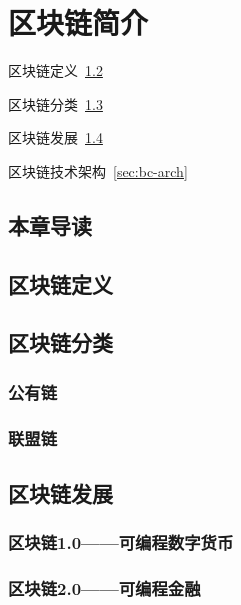 \chapter{区块链简介}

\begin{introduction}
  \item 区块链定义~\ref{sec:bc-def}
  \item 区块链分类~\ref{sec:bc-type}
  \item 区块链发展~\ref{sec:bc-dev}
  \item 区块链技术架构~\ref{sec:bc-arch}
\end{introduction}



\section{本章导读}


\section{区块链定义}\label{sec:bc-def}



\section{区块链分类}\label{sec:bc-type}

\subsection{公有链}

\subsection{联盟链}

\section{区块链发展}\label{sec:bc-dev}

\subsection{区块链1.0——可编程数字货币}

\subsection{区块链2.0——可编程金融}

